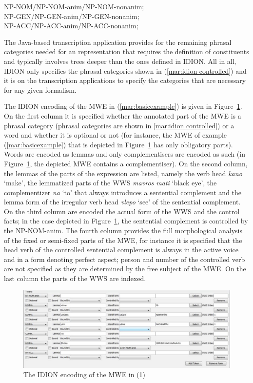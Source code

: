 \documentclass[output=paper]{langsci/langscibook}
\begin{document}
\ea\label{mar:idion controlled}
NP-NOM/NP-NOM-anim/NP-NOM-nonanim;\\ 
NP-GEN/NP-GEN-anim/NP-GEN-nonanim;\\ 
      NP-ACC/NP-ACC-anim/NP-ACC-nonanim; \\
\z

The Java-based transcription application provides for the remaining phrasal categories needed for an  representation that requires the definition of constituents and typically involves trees deeper than the ones defined in IDION. 
All in all, IDION only specifies the phrasal categories shown in  (\ref{mar:idion controlled}) and it is on the transcription applications to specify the categories that are necessary for any given formalism.

 The IDION encoding of the MWE in (\ref{mar:basicexample}) is given in Figure~\ref{mar:Sfig3}. On the first column it is specified whether the annotated part of the MWE is a phrasal category (phrasal categories are shown in \ref{mar:idion controlled}) or a word and whether it is optional or not (for instance, the MWE of example (\ref{mar:basicexample}) that is depicted in Figure~\ref{mar:Sfig3} has only obligatory parts). Words are encoded as lemmas and only complementisers are encoded as such (in Figure~\ref{mar:Sfig3}, the depicted MWE contains a complementiser).  On the second column, the lemmas of the parts of the expression are listed, namely the verb head \textit{kano} `make', the lemmatized parts of the WWS \textit{mavros mati} `black eye', the complementizer \textit{na} `to' that always  introduces a sentential complement and the lemma form of the irregular verb head \textit{vlepo} `see' of the sentential complement. On the third column are encoded the actual form of the WWS and the control facts; in the case depicted in Figure~\ref{mar:Sfig3},  the sentential complement is controlled by the NP-NOM-anim. The fourth column provides the full morphological analysis of the fixed or semi-fixed parts of the MWE, for instance it is specified that the head verb of the controlled sentential complement is always in the active voice and in a form denoting perfect aspect; person and number of the controlled verb are not specified as they are determined by the free subject of the MWE. On the last column the parts of the WWS are indexed. 

 \begin{figure}[h!]
  \caption{\label{mar:Sfig3}The IDION encoding of the MWE in (1)}
  \centering
 \includegraphics[width=1\textwidth]{figures/idionencoding}
\end{figure}
 
\end{document}
